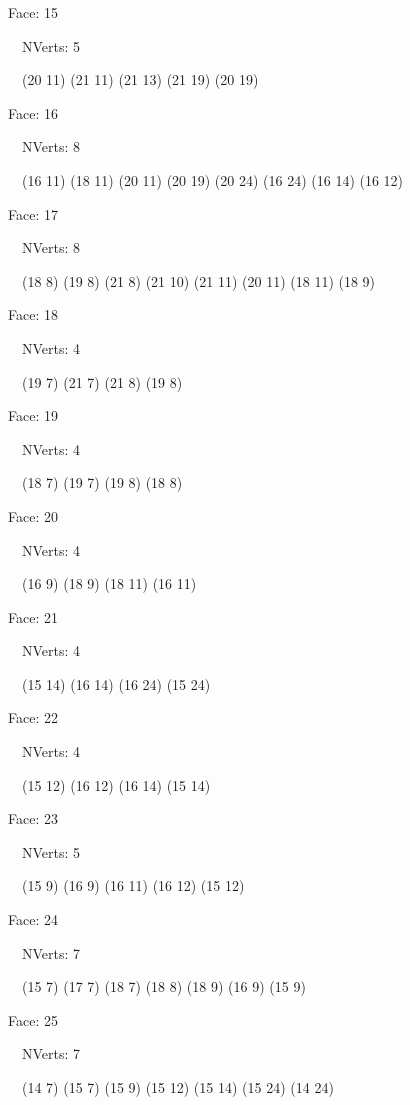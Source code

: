 \documentclass{article}
\begin{document}
{\footnotesize 

Face: 15

\   \    NVerts: 5

 \   \   (20 11) (21 11) (21 13) (21 19) (20 19)}

{\footnotesize 

Face: 16

\   \    NVerts: 8

 \   \   (16 11) (18 11) (20 11) (20 19) (20 24) (16 24) (16 14) (16 12)}

{\footnotesize 

Face: 17

\   \    NVerts: 8

 \   \   (18 8) (19 8) (21 8) (21 10) (21 11) (20 11) (18 11) (18 9)}

{\footnotesize 

Face: 18

\   \    NVerts: 4

 \   \   (19 7) (21 7) (21 8) (19 8)}

{\footnotesize 

Face: 19

\   \    NVerts: 4

 \   \   (18 7) (19 7) (19 8) (18 8)}

{\footnotesize 

Face: 20

\   \    NVerts: 4

 \   \   (16 9) (18 9) (18 11) (16 11)}

{\footnotesize 

Face: 21

\   \    NVerts: 4

 \   \   (15 14) (16 14) (16 24) (15 24)}

{\footnotesize 

Face: 22

\   \    NVerts: 4

 \   \   (15 12) (16 12) (16 14) (15 14)}

{\footnotesize 

Face: 23

\   \    NVerts: 5

 \   \   (15 9) (16 9) (16 11) (16 12) (15 12)}

{\footnotesize 

Face: 24

\   \    NVerts: 7

 \   \   (15 7) (17 7) (18 7) (18 8) (18 9) (16 9) (15 9)}

{\footnotesize 

Face: 25

\   \    NVerts: 7

 \   \   (14 7) (15 7) (15 9) (15 12) (15 14) (15 24) (14 24)}
\end{document}
